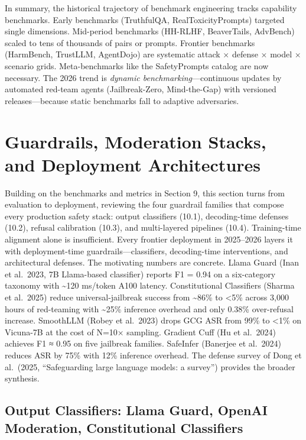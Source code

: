 In summary, the historical trajectory of benchmark engineering tracks capability benchmarks. Early benchmarks (TruthfulQA, RealToxicityPrompts) targeted single dimensions. Mid-period benchmarks (HH-RLHF, BeaverTails, AdvBench) scaled to tens of thousands of pairs or prompts. Frontier benchmarks (HarmBench, TrustLLM, AgentDojo) are systematic attack × defense × model × scenario grids. Meta-benchmarks like the SafetyPrompts catalog are now necessary. The 2026 trend is \emph{dynamic benchmarking}---continuous updates by automated red-team agents (Jailbreak-Zero, Mind-the-Gap) with versioned releases---because static benchmarks fall to adaptive adversaries.

\section{Guardrails, Moderation Stacks, and Deployment Architectures}\label{guardrails-moderation-stacks-and-deployment-architectures}

Building on the benchmarks and metrics in Section 9, this section turns from evaluation to deployment, reviewing the four guardrail families that compose every production safety stack: output classifiers (10.1), decoding-time defenses (10.2), refusal calibration (10.3), and multi-layered pipelines (10.4). Training-time alignment alone is insufficient. Every frontier deployment in 2025--2026 layers it with deployment-time guardrails---classifiers, decoding-time interventions, and architectural defenses. The motivating numbers are concrete. Llama Guard (Inan et al.~2023, 7B Llama-based classifier) reports F1 = 0.94 on a six-category taxonomy with \textasciitilde120 ms/token A100 latency. Constitutional Classifiers (Sharma et al.~2025) reduce universal-jailbreak success from \textasciitilde86\% to \textless5\% across 3,000 hours of red-teaming with \textasciitilde25\% inference overhead and only 0.38\% over-refusal increase. SmoothLLM (Robey et al.~2023) drops GCG ASR from 99\% to \textless1\% on Vicuna-7B at the cost of N=10× sampling. Gradient Cuff (Hu et al.~2024) achieves F1 ≈ 0.95 on five jailbreak families. SafeInfer (Banerjee et al.~2024) reduces ASR by 75\% with 12\% inference overhead. The defense survey of Dong et al.~(2025, ``Safeguarding large language models: a survey'') provides the broader synthesis.

\subsection{Output Classifiers: Llama Guard, OpenAI Moderation, Constitutional Classifiers}\label{output-classifiers-llama-guard-openai-moderation-constitutional-classifiers}

